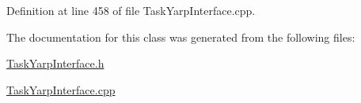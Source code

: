 Definition at line 458 of file Task\+Yarp\+Interface.\+cpp.



The documentation for this class was generated from the following files\+:\begin{DoxyCompactItemize}
\item 
\hyperlink{TaskYarpInterface_8h}{Task\+Yarp\+Interface.\+h}\item 
\hyperlink{TaskYarpInterface_8cpp}{Task\+Yarp\+Interface.\+cpp}\end{DoxyCompactItemize}
